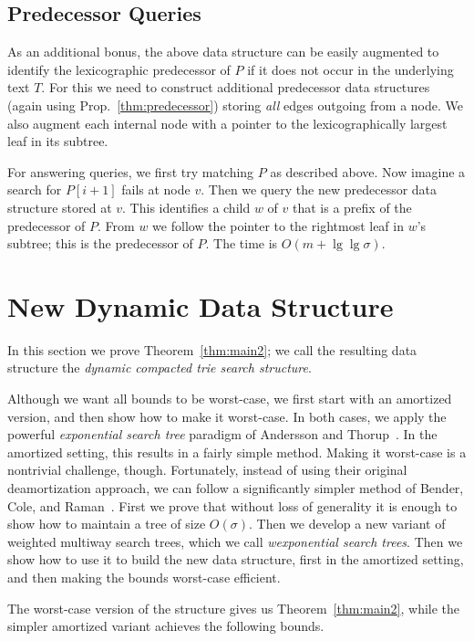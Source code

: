 \documentclass[11pt,onecolumn,final]{article} \usepackage{a4}
\theoremstyle{plain}
\theoremstyle{remark}
\begin{document}
\subsection{Predecessor Queries}
As an additional bonus, the above data structure can be easily augmented to identify the lexicographic predecessor of $P$ if it does not occur in the underlying text $T$. For this we need to construct additional predecessor data structures (again using Prop.~\ref{thm:predecessor}) storing \emph{all} edges outgoing from a node. We also augment each internal node with a pointer to the lexicographically largest leaf in its subtree.

For answering queries, we first try matching $P$ as described above. Now imagine a search for $P[i+1]$ fails at node $v$. Then we query the new predecessor data structure stored at $v$. This identifies a child $w$ of $v$ that is a prefix of the predecessor of $P$. From $w$ we follow the pointer to the rightmost leaf in $w$'s subtree; this is the predecessor of $P$. The time is $O(m+\lg\lg\sigma)$.

\section{New Dynamic Data Structure}

In this section we prove Theorem~\ref{thm:main2}; we call the resulting data structure the \emph{dynamic compacted trie search structure}.


Although we want all bounds to be worst-case, we first start with an amortized version, and then show how to make it worst-case. In both cases, we apply the powerful \emph{exponential search tree} paradigm of Andersson and Thorup~\cite{andersson07dynamic}. In the amortized setting, this results in a fairly simple method. Making it worst-case is a nontrivial challenge, though. Fortunately, instead of using their original deamortization approach, we can follow a significantly simpler method of Bender, Cole, and Raman~\cite{bender02exponential}. First we prove that without loss of generality it is enough to show how to maintain a tree of size $O(\sigma)$. Then we develop a new variant of weighted multiway search trees, which we call \emph{wexponential search trees}. Then we show how to use it to build the new data structure, first in the amortized setting, and then making the bounds worst-case efficient.

The worst-case version of the structure gives us Theorem~\ref{thm:main2}, while the simpler amortized variant achieves the following bounds.
\end{document}
